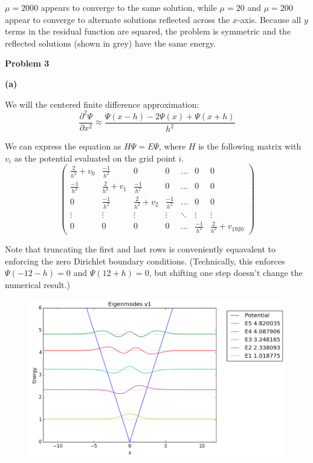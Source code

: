 \documentclass[11pt]{article}
\newcommand{\problem}{\medskip \noindent \textbf}
\begin{document}
$\mu = 2000$ appears to converge to the same solution, while $\mu = 20$ and $\mu = 200$ appear to converge to alternate solutions reflected across the $x$-axis.  Because all $y$ terms in the residual function are squared, the problem is symmetric and the reflected solutions (shown in grey) have the same energy.

\pagebreak

\problem{Problem 3}

\problem{(a)}

We will the centered finite difference approximation:
$$\frac{\partial^2 \Psi}{\partial x^2} \approx \frac{\Psi(x-h) - 2\Psi(x) + \Psi(x+h)}{h^2}$$

We can express the equation as $H\Psi = E\Psi$, where $H$ is the following matrix with $v_i$ as the potential evaluated on the grid point $i$.
\[
\begin{pmatrix}
\frac{2}{h^2} + v_0 & \frac{-1}{h^2} & 0 & 0 & \dots & 0 & 0\\
\frac{-1}{h^2} &  \frac{2}{h^2} + v_1 & \frac{-1}{h^2} & 0 & \dots & 0 & 0\\
0 & \frac{-1}{h^2} &  \frac{2}{h^2} + v_2 & \frac{-1}{h^2} & \dots & 0 & 0\\
\vdots & \vdots & \vdots & \vdots & \ddots & \vdots & \vdots\\
0 & 0 & 0 & 0 & \dots & \frac{-1}{h^2} & \frac{2}{h^2} + v_{1920}
\end{pmatrix}
\]

Note that truncating the first and last rows is conveniently equavalent to enforcing the zero Dirichlet boundary conditions.  (Technically, this enforces $\Psi(-12-h) = 0$ and $\Psi(12+h) = 0$, but shifting one step doesn't change the numerical result.)

\begin{figure}[h!]
  \includegraphics[width=5.5in]{eigv1.png}
\end{figure}
\end{document}
